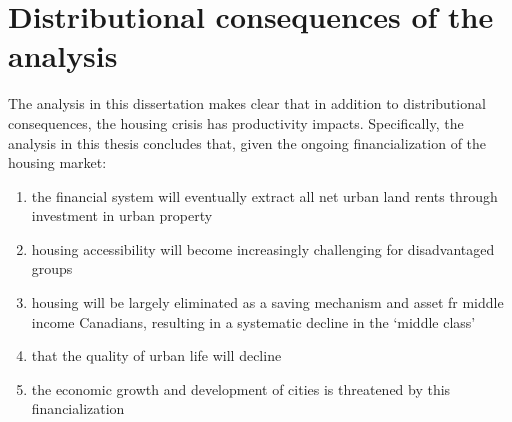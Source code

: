 %
%


\section{Distributional consequences of the analysis}
The analysis in this dissertation makes clear that in addition to distributional consequences, the housing crisis has productivity impacts. Specifically, the analysis in this thesis concludes that, given the ongoing financialization of the housing market:

\begin{enumerate}
\item the financial system will eventually extract all net urban land rents through investment in urban property
\item housing accessibility will become increasingly challenging for disadvantaged groups
\item housing will be largely eliminated as a saving mechanism and asset fr middle income Canadians,  resulting in a systematic decline in the `middle class'
\item that the quality of urban life will decline
\item the economic growth and development of cities is threatened by this financialization
\end{enumerate}

